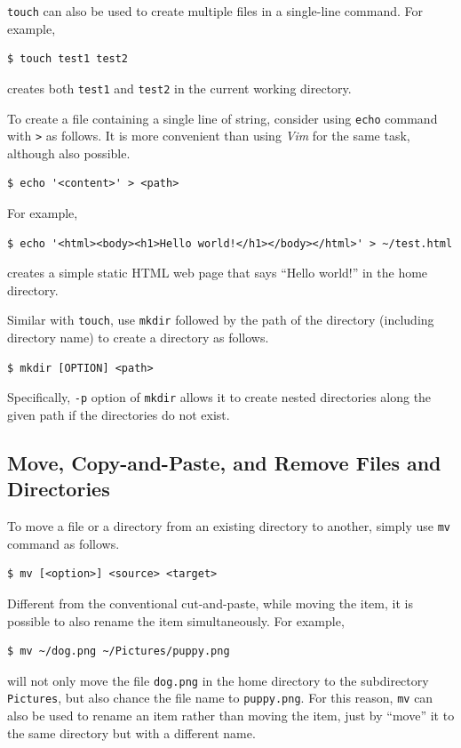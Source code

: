 \verb|touch| can also be used to create multiple files in a single-line command. For example,
\begin{lstlisting}
$ touch test1 test2
\end{lstlisting}
creates both \texttt{test1} and \texttt{test2} in the current working directory.

To create a file containing a single line of string, consider using \verb|echo| command with \verb|>| as follows. It is more convenient than using \textit{Vim} for the same task, although also possible.
\begin{lstlisting}
$ echo '<content>' > <path>
\end{lstlisting}
For example,
\begin{lstlisting}
$ echo '<html><body><h1>Hello world!</h1></body></html>' > ~/test.html
\end{lstlisting}
creates a simple static HTML web page that says ``Hello world!'' in the home directory.

Similar with \verb|touch|, use \verb|mkdir| followed by the path of the directory (including directory name) to create a directory as follows.
\begin{lstlisting}
$ mkdir [OPTION] <path>
\end{lstlisting}
Specifically, \verb|-p| option of \verb|mkdir| allows it to create nested directories along the given path if the directories do not exist.

\subsection{Move, Copy-and-Paste, and Remove Files and Directories}

To move a file or a directory from an existing directory to another, simply use \verb|mv| command as follows.
\begin{lstlisting}
$ mv [<option>] <source> <target>
\end{lstlisting}
Different from the conventional cut-and-paste, while moving the item, it is possible to also rename the item simultaneously. For example,
\begin{lstlisting}
$ mv ~/dog.png ~/Pictures/puppy.png
\end{lstlisting}
will not only move the file \verb|dog.png| in the home directory to the subdirectory \verb|Pictures|, but also chance the file name to \verb|puppy.png|. For this reason, \verb|mv| can also be used to rename an item rather than moving the item, just by ``move'' it to the same directory but with a different name.


